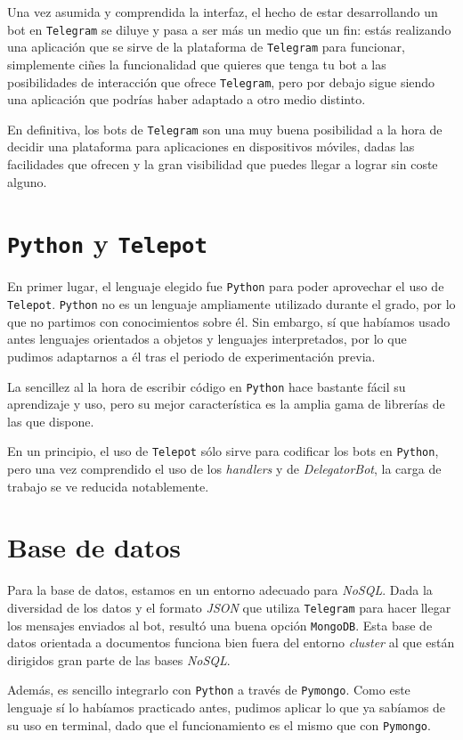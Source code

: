 \documentclass[oneside]{memoir}
\begin{document}
Una vez asumida y comprendida la interfaz, el hecho de estar desarrollando un bot en \texttt{Telegram} se diluye y pasa a ser más un medio que un fin: estás realizando una aplicación que se sirve de la plataforma de \texttt{Telegram} para funcionar, simplemente ciñes la funcionalidad que quieres que tenga tu bot a las posibilidades de interacción que ofrece \texttt{Telegram}, pero por debajo sigue siendo una aplicación que podrías haber adaptado a otro medio distinto.

En definitiva, los bots de \texttt{Telegram} son una muy buena posibilidad a la hora de decidir una plataforma para aplicaciones en dispositivos móviles, dadas las facilidades que ofrecen y la gran visibilidad que puedes llegar a lograr sin coste alguno.

\section{\texttt{Python} y \texttt{Telepot}}
En primer lugar, el lenguaje elegido fue \texttt{Python} para poder aprovechar el uso de \texttt{Telepot}. \texttt{Python} no es un lenguaje ampliamente utilizado durante el grado, por lo que no partimos con conocimientos sobre él. Sin embargo, sí que habíamos usado antes lenguajes orientados a objetos y lenguajes interpretados, por lo que pudimos adaptarnos a él tras el periodo de experimentación previa.

La sencillez al la hora de escribir código en \texttt{Python} hace bastante fácil su aprendizaje y uso, pero su mejor característica es la amplia gama de librerías de las que dispone.

En un principio, el uso de \texttt{Telepot} sólo sirve para codificar los bots en \texttt{Python}, pero una vez comprendido el uso de los \textit{handlers} y de \textit{DelegatorBot}, la carga de trabajo se ve reducida notablemente. 

\section{Base de datos}
Para la base de datos, estamos en un entorno adecuado para \textit{NoSQL}. Dada la diversidad de los datos y el formato \textit{JSON} que utiliza \texttt{Telegram} para hacer llegar los mensajes enviados al bot, resultó una buena opción \texttt{MongoDB}. Esta base de datos orientada a documentos funciona bien fuera del entorno \textit{cluster} al que están dirigidos gran parte de las bases \textit{NoSQL}.

Además, es sencillo integrarlo con \texttt{Python} a través de \texttt{Pymongo}. Como este lenguaje sí lo habíamos practicado antes, pudimos aplicar lo que ya sabíamos de su uso en terminal, dado que el funcionamiento es el mismo que con \texttt{Pymongo}. 
\end{document}
